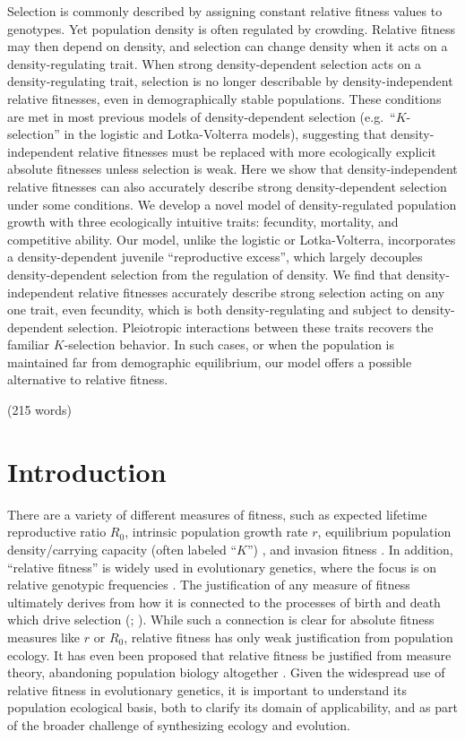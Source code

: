 \documentclass[12pt]{article}
\begin{document}
Selection is commonly described by assigning constant relative fitness values to genotypes. Yet population density is often regulated by crowding. Relative fitness may then depend on density, and selection can change density when it acts on a density-regulating trait. When strong density-dependent selection acts on a density-regulating trait, selection is no longer describable by density-independent relative fitnesses, even in demographically stable populations. These conditions are met in most previous models of density-dependent selection (e.g.~``$K$-selection'' in the logistic and Lotka-Volterra models), suggesting that density-independent relative fitnesses must be replaced with more ecologically explicit absolute fitnesses unless selection is weak. Here we show that density-independent relative fitnesses can also accurately describe strong density-dependent selection under some conditions. We develop a novel model of density-regulated population growth with three ecologically intuitive traits: fecundity, mortality, and competitive ability. Our model, unlike the logistic or Lotka-Volterra, incorporates a density-dependent juvenile ``reproductive excess'', which largely decouples density-dependent selection from the regulation of density. We find that density-independent relative fitnesses accurately describe strong selection acting on any one trait, even fecundity, which is both density-regulating and subject to density-dependent selection. Pleiotropic interactions between these traits recovers the familiar $K$-selection behavior. In such cases, or when the population is maintained far from demographic equilibrium, our model offers a possible alternative to relative fitness. 

\noindent (215 words)

\newpage{}


\section*{Introduction}

There are a variety of different measures of fitness, such as expected lifetime reproductive ratio $R_0$, intrinsic population growth rate $r$, equilibrium population density/carrying capacity (often labeled ``$K$'') \citep{benton_2000}, and invasion fitness \citep{metz_1992}. In addition, ``relative fitness'' is widely used in evolutionary genetics, where the focus is on relative genotypic frequencies \cite[pp. 468]{barton_2007}. The justification of any measure of fitness ultimately derives from how it is connected to the processes of birth and death which drive selection (\citealt{metcalf_2007,doebeli_2017}; \citealt[pp. 178]{charlesworth_1994}). While such a connection is clear for absolute fitness measures like $r$ or $R_0$, relative fitness has only weak justification from population ecology. It has even been proposed that relative fitness be justified from measure theory, abandoning population biology altogether \citep{wagner_2010}. Given the widespread use of relative fitness in evolutionary genetics, it is important to understand its population ecological basis, both to clarify its domain of applicability, and as part of the broader challenge of synthesizing ecology and evolution.
\end{document}
